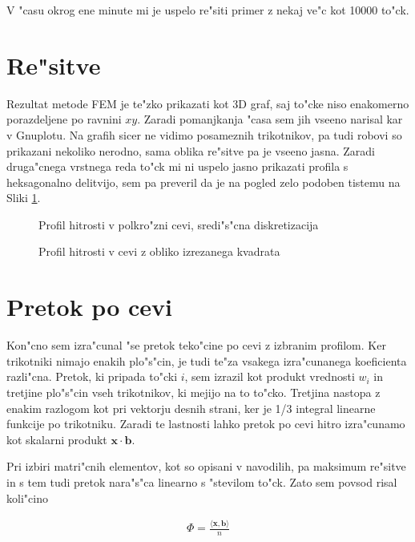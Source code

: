 \documentclass[a4paper,10pt]{article}
\renewcommand{\vec}{\mathbf}
\begin{document}
V "casu okrog ene minute mi je uspelo re"siti primer z nekaj ve"c kot 10000 to"ck. 

\section{Re"sitve}

Rezultat metode FEM je te"zko prikazati kot 3D graf, saj to"cke niso enakomerno porazdeljene po ravnini $xy$. Zaradi pomanjkanja "casa sem jih vseeno narisal kar v Gnuplotu. Na grafih sicer ne vidimo posameznih trikotnikov, pa tudi robovi so prikazani nekoliko nerodno, sama oblika re"sitve pa je vseeno jasna. Zaradi druga"cnega vrstnega reda to"ck mi ni uspelo jasno prikazati profila s heksagonalno delitvijo, sem pa preveril da je na pogled zelo podoben tistemu na Sliki \ref{fig:profil-srediscna}. 

\begin{figure}[H]
\centering
 
 \caption{Profil hitrosti v polkro"zni cevi, sredi"s"cna diskretizacija}
 \label{fig:profil-srediscna}
\end{figure}

\begin{figure}[H]
\centering
 
 \caption{Profil hitrosti v cevi z obliko izrezanega kvadrata}
 \label{fig:profil-kvadrat}
\end{figure}


\section{Pretok po cevi}

Kon"cno sem izra"cunal "se pretok teko"cine po cevi z izbranim profilom. Ker trikotniki nimajo enakih plo"s"cin, je tudi te"za vsakega izra"cunanega koeficienta razli"cna. Pretok, ki pripada to"cki $i$, sem izrazil kot produkt vrednosti $w_i$ in tretjine plo"s"cin vseh trikotnikov, ki mejijo na to to"cko. Tretjina nastopa z enakim razlogom kot pri vektorju desnih strani, ker je 1/3 integral linearne funkcije po trikotniku. Zaradi te lastnosti lahko pretok po cevi hitro izra"cunamo kot skalarni produkt $\vec x \cdot \vec b$.  

Pri izbiri matri"cnih elementov, kot so opisani v navodilih, pa maksimum re"sitve in s tem tudi pretok nara"s"ca linearno s "stevilom to"ck. Zato sem povsod risal koli"cino 

\begin{align}
 \Phi = \frac{\langle \vec x, \vec b\rangle}{n}
\end{align}
\end{document}
